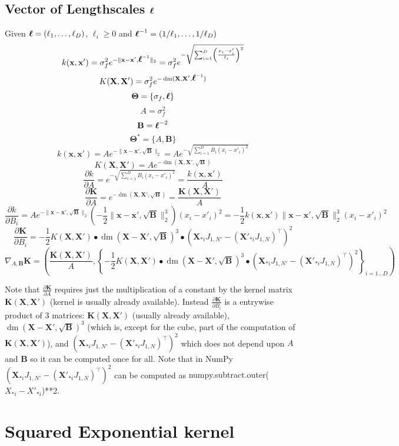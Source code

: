 \documentclass[a4paper,11pt]{article}
\newcommand\x{{\mathbf x}}
\newcommand\X{{\mathbf X}}
\newcommand\K{{\mathbf K}}
\newcommand\ELL{{\Ivec \ell}}
\DeclareMathOperator*{\dm}{dm}
\newcommand{\Ivec}[1]{\mbox{\boldmath $#1$}}
\begin{document}
\subsection{Vector of Lengthscales $\Ivec{\ell}$}
Given $\Ivec{\ell} = (\ell_1,\ldots,\ell_D)$, $\ell_i \ge 0$ and
$\ELL^{-1} = (1/\ell_1,\ldots,1/\ell_D)$
$$k(\x,\x') = \sigma_f^2 e^{-\|\x-\x',\ELL^{-1}\|_2}= \sigma_f^2
  e^{-\sqrt{\sum_{i=1}^D \left(\frac{x_i - x'_i}{\ell_i}\right)^2}}$$
$$K(\X,\X') = \sigma_f^2 e^{-\dm(\X,\X',\ELL^{-1})}$$
$$\mathbf{\Theta} = \{ \sigma_f, \ELL\}$$
$$A = \sigma_f^2$$
$$\mathbf{B} = \ELL^{-2}$$
$$\mathbf{\Theta}^* = \{ A, \mathbf{B}\}$$
$$k(\x,\x') = A e^{-\|\x-\x',\sqrt{\mathbf{B}}\|_2} = A e^{-\sqrt{\sum_{i=1}^D
    B_i(x_i - x'_i)^2}}$$  
$$K(\X,\X') = A e^{-\dm(\X,\X',\sqrt{\mathbf{B}})}$$
$$\frac{\partial k}{\partial A} = e^{-\sqrt{\sum_{i=1}^D B_i(x_i -
    x'_i)^2}} = \frac{k(\x,\x')}{A}$$
$$\frac{\partial \K}{\partial A} = e^{-\dm(\X,\X',\sqrt{\mathbf{B}})} =
\frac{\K(\X,\X')}{A}$$ 
$$\frac{\partial k}{\partial B_i} = A e^{-\|\x-\x',\sqrt{\mathbf{B}}\|_2}
\left( -\frac{1}{2} \|\x-\x',\sqrt{\mathbf{B}}\|_2^3 \right) (x_i - x'_i)^2 =
-\frac{1}{2} k(\x,\x') \|\x-\x',\sqrt{\mathbf{B}}\|_2^3 (x_i - x'_i)^2 $$
$$\frac{\partial \K}{\partial B_i} = -\frac{1}{2} K(\X,\X')
\bullet \dm(\X-\X',\sqrt{\mathbf{B}})^3 \bullet (\X_{*i}J_{1,N'}-
(\X'_{*i}J_{1,N})^{\top})^2$$
$$\nabla_{A,\mathbf{B}} \K = \left(\frac{\K(\X,\X')}{A}, \left\{-\frac{1}{2}
    K(\X,\X') \bullet \dm(\X-\X',\sqrt{\mathbf{B}})^3 \bullet
    (\X_{*i}J_{1,N'}- (\X'_{*i}J_{1,N})^{\top})^2 \right\}_{i=1 \ldots
    D} \right)$$

Note that $\frac{\partial \K}{\partial A}$ requires just the
multiplication of a constant by the kernel matrix $\K(\X,\X')$ (kernel
is usually already available). Instead $\frac{\partial \K}{\partial
  B_i}$ is a entrywise product of 3 matrices: $\K(\X,\X')$ (usually
already available), $\dm(\X-\X',\sqrt{\mathbf{B}})^3$ (which is,
except for the cube, part of the computation of $\K(\X,\X')$), and
$(\X_{*i}J_{1,N'}- (\X'_{*i}J_{1,N})^{\top})^2$ which does not depend
upon $A$ and $\mathbf{B}$ so it can be computed once for all. Note
that in NumPy $(\X_{*i}J_{1,N'}- (\X'_{*i}J_{1,N})^{\top})^2$ can be
computed as {\ttfamily numpy.subtract.outer($X_{*i}-X'_{*i}$)**2}.

\section{Squared Exponential kernel}
\end{document}
